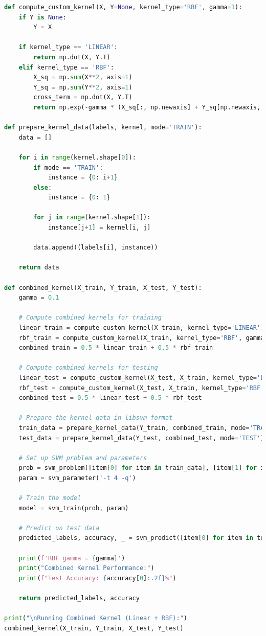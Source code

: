 \documentclass{homework}
\begin{document}
\begin{lstlisting}[language=Python]
def compute_custom_kernel(X, Y=None, kernel_type='RBF', gamma=1):
    if Y is None:
        Y = X
    
    if kernel_type == 'LINEAR':
        return np.dot(X, Y.T)
    elif kernel_type == 'RBF':
        X_sq = np.sum(X**2, axis=1)
        Y_sq = np.sum(Y**2, axis=1)
        cross_term = np.dot(X, Y.T)
        return np.exp(-gamma * (X_sq[:, np.newaxis] + Y_sq[np.newaxis, :] - 2 * cross_term))
    
def prepare_kernel_data(labels, kernel, mode='TRAIN'):
    data = []
    
    for i in range(kernel.shape[0]):
        if mode == 'TRAIN':
            instance = {0: i+1}
        else:
            instance = {0: 1}
        
        for j in range(kernel.shape[1]):
            instance[j+1] = kernel[i, j]
        
        data.append((labels[i], instance))
    
    return data

def combined_kernel(X_train, Y_train, X_test, Y_test):
    gamma = 0.1
    
    # Compute combined kernels for training
    linear_train = compute_custom_kernel(X_train, kernel_type='LINEAR')
    rbf_train = compute_custom_kernel(X_train, kernel_type='RBF', gamma=gamma)
    combined_train = 0.5 * linear_train + 0.5 * rbf_train

    # Compute combined kernels for testing
    linear_test = compute_custom_kernel(X_test, X_train, kernel_type='LINEAR')
    rbf_test = compute_custom_kernel(X_test, X_train, kernel_type='RBF', gamma=gamma)
    combined_test = 0.5 * linear_test + 0.5 * rbf_test

    # Prepare the kernel data in libsvm format
    train_data = prepare_kernel_data(Y_train, combined_train, mode='TRAIN')
    test_data = prepare_kernel_data(Y_test, combined_test, mode='TEST')

    # Set up SVM problem and parameters
    prob = svm_problem([item[0] for item in train_data], [item[1] for item in train_data])
    param = svm_parameter('-t 4 -q')
    
    # Train the model
    model = svm_train(prob, param)

    # Predict on test data
    predicted_labels, accuracy, _ = svm_predict([item[0] for item in test_data], [item[1] for item in test_data], model)
    
    print(f'RBF gamma = {gamma}')
    print("Combined Kernel Performance:")
    print(f"Test Accuracy: {accuracy[0]:.2f}%")
    
    return predicted_labels, accuracy

print("\nRunning Combined Kernel (Linear + RBF):")
combined_kernel(X_train, Y_train, X_test, Y_test)
\end{lstlisting}
\end{document}
